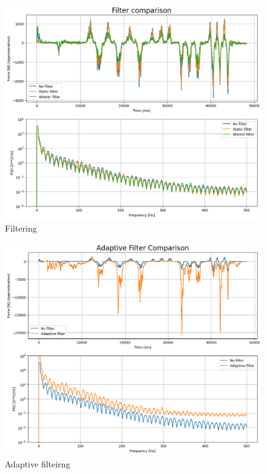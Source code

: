 \begin{figure}[h!t]
	\begin{center}
		\includegraphics[width=0.8\columnwidth]{images/measurement_filtering.png}
	\end{center}
	\caption{Filtering}
	\label{fig:result_filtering}
\end{figure}
\begin{figure}[h!t]
	\begin{center}
		\includegraphics[width=0.8\columnwidth]{images/measurement_adaptive_filtering.png}
	\end{center}
	\caption{Adaptive filteirng}
	\label{fig:result_adaptive_filtering}
\end{figure}

